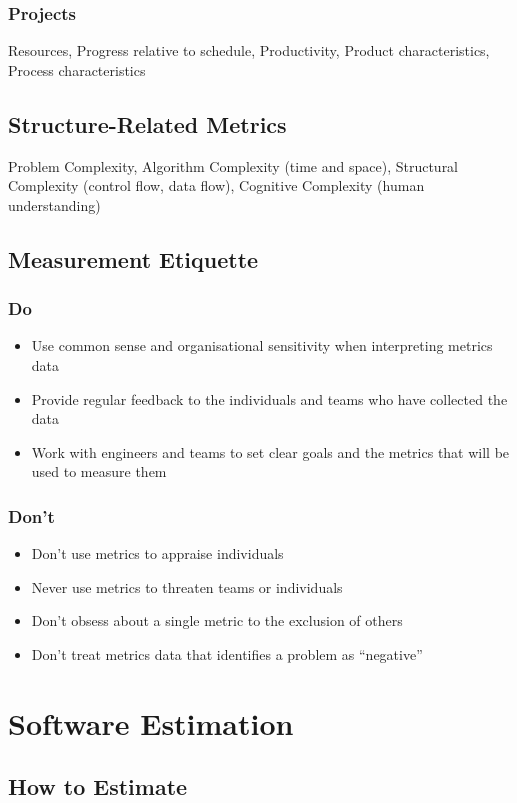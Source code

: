 \documentclass[10pt,a4paper]{article}
\begin{document}
\begin{landscape}
\begin{multicols}{3}
\subsubsection{Projects}
Resources, Progress relative to schedule, Productivity, Product characteristics, Process characteristics
\subsection{Structure-Related Metrics}
Problem Complexity, Algorithm Complexity (time and space), Structural Complexity (control flow, data flow), Cognitive Complexity (human understanding)
\subsection{Measurement Etiquette}
\subsubsection{Do}
\begin{itemize}
    \item Use common sense and organisational sensitivity when interpreting metrics data
    \item Provide regular feedback to the individuals and teams who have collected the data
    \item Work with engineers and teams to set clear goals and the metrics that will be used to measure them
\end{itemize}
\subsubsection{Don't}
\begin{itemize}
    \item Don't use metrics to appraise individuals
    \item Never use metrics to threaten teams or individuals
    \item Don't obsess about a single metric to the exclusion of others
    \item Don't treat metrics data that identifies a problem as ``negative''
\end{itemize}

\section{Software Estimation}
\subsection{How to Estimate}

\end{multicols}
\end{landscape}
\end{document}
